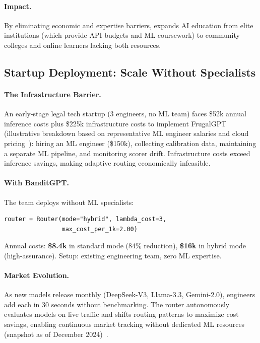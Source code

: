 \paragraph{Impact.} By eliminating economic and expertise barriers, \ours{} expands AI education from elite institutions (which provide API budgets and ML coursework) to community colleges and online learners lacking both resources.

\subsection{Startup Deployment: Scale Without Specialists}

\paragraph{The Infrastructure Barrier.} An early-stage legal tech startup (3 engineers, no ML team) faces \$52k annual inference costs plus \$225k infrastructure costs to implement FrugalGPT (illustrative breakdown based on representative ML engineer salaries and cloud pricing~\cite{builtin2025salary,openai2025pricing}): hiring an ML engineer (\$150k), collecting calibration data, maintaining a separate ML pipeline, and monitoring scorer drift. Infrastructure costs exceed inference savings, making adaptive routing economically infeasible.

\paragraph{With BanditGPT.} The team deploys without ML specialists:

\begin{small}
\begin{verbatim}
router = Router(mode="hybrid", lambda_cost=3,
                max_cost_per_1k=2.00)
\end{verbatim}
\end{small}

\noindent Annual costs: \textbf{\$8.4k} in standard mode (84\% reduction), \textbf{\$16k} in hybrid mode (high-assurance). Setup: existing engineering team, zero ML expertise.

\paragraph{Market Evolution.} As new models release monthly (DeepSeek-V3, Llama-3.3, Gemini-2.0), engineers add each in 30 seconds without benchmarking. The router autonomously evaluates models on live traffic and shifts routing patterns to maximize cost savings, enabling continuous market tracking without dedicated ML resources (snapshot as of December 2024)~\cite{openrouter2025models,artificialanalysis2025}.

